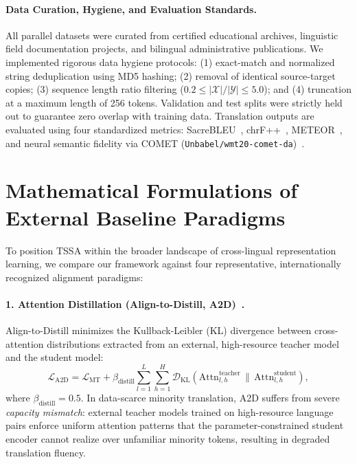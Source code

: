 \documentclass[11pt]{article}
\begin{document}
\paragraph{Data Curation, Hygiene, and Evaluation Standards.}
All parallel datasets were curated from certified educational archives, linguistic field documentation projects, and bilingual administrative publications. We implemented rigorous data hygiene protocols: (1) exact-match and normalized string deduplication using MD5 hashing; (2) removal of identical source-target copies; (3) sequence length ratio filtering ($0.2 \le |\mathcal{X}|/|\mathcal{Y}| \le 5.0$); and (4) truncation at a maximum length of 256 tokens. Validation and test splits were strictly held out to guarantee zero overlap with training data. Translation outputs are evaluated using four standardized metrics: SacreBLEU~\cite{post2018call}, chrF++~\cite{popovic-2017-chrf}, METEOR~\cite{banerjee2005meteor}, and neural semantic fidelity via COMET (\texttt{Unbabel/wmt20-comet-da})~\cite{rei2020comet}.

\section{Mathematical Formulations of External Baseline Paradigms}
\label{sec:appendix_baselines}

To position TSSA within the broader landscape of cross-lingual representation learning, we compare our framework against four representative, internationally recognized alignment paradigms:

\paragraph{1. Attention Distillation (Align-to-Distill, A2D)~\cite{jin2024align}.}
Align-to-Distill minimizes the Kullback-Leibler (KL) divergence between cross-attention distributions extracted from an external, high-resource teacher model and the student model:
\begin{equation}
    \mathcal{L}_{\text{A2D}} = \mathcal{L}_{\text{MT}} + \beta_{\text{distill}} \sum_{l=1}^L \sum_{h=1}^H \mathcal{D}_{\text{KL}}\left(\text{Attn}_{l,h}^{\text{teacher}} \,\|\, \text{Attn}_{l,h}^{\text{student}}\right),
\end{equation}
where $\beta_{\text{distill}} = 0.5$. In data-scarce minority translation, A2D suffers from severe \textit{capacity mismatch}: external teacher models trained on high-resource language pairs enforce uniform attention patterns that the parameter-constrained student encoder cannot realize over unfamiliar minority tokens, resulting in degraded translation fluency.
\end{document}
